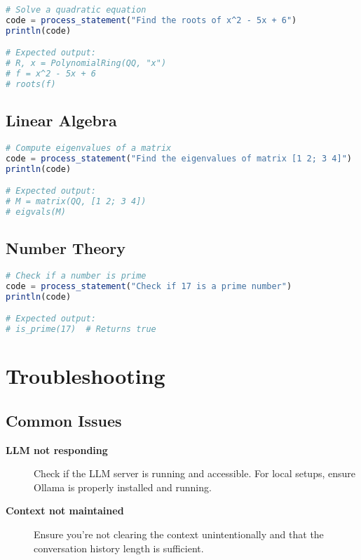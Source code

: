\documentclass[11pt,a4paper]{article}
\newcommand{\important}[1]{\textbf{#1}}
\providecommand{\important}[1]{\textbf{\color{red!70!black}#1}}
\begin{document}
\begin{lstlisting}[language=Julia]
# Solve a quadratic equation
code = process_statement("Find the roots of x^2 - 5x + 6")
println(code)

# Expected output:
# R, x = PolynomialRing(QQ, "x")
# f = x^2 - 5x + 6
# roots(f)
\end{lstlisting}

\subsection{Linear Algebra}

\begin{lstlisting}[language=Julia]
# Compute eigenvalues of a matrix
code = process_statement("Find the eigenvalues of matrix [1 2; 3 4]")
println(code)

# Expected output:
# M = matrix(QQ, [1 2; 3 4])
# eigvals(M)
\end{lstlisting}

\subsection{Number Theory}

\begin{lstlisting}[language=Julia]
# Check if a number is prime
code = process_statement("Check if 17 is a prime number")
println(code)

# Expected output:
# is_prime(17)  # Returns true
\end{lstlisting}

\section{Troubleshooting}
\label{sec:troubleshooting}

\subsection{Common Issues}

\begin{description}
    \item[\important{LLM not responding}] Check if the LLM server is running and accessible. For local setups, ensure Ollama is properly installed and running.
    
    \item[\important{Context not maintained}] Ensure you're not clearing the context unintentionally and that the conversation history length is sufficient.
\end{description}
\end{document}
